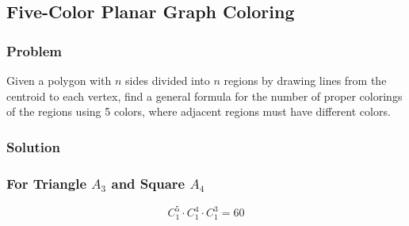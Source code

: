 \documentclass[11pt]{article}
\begin{document}
\subsection{Five-Color Planar Graph Coloring}
\subsubsection{Problem}
Given a polygon with $n$ sides divided into $n$ regions by drawing lines from the centroid to each vertex, find a general formula for the number of proper colorings of the regions using 5 colors, where adjacent regions must have different colors.
\subsubsection*{Solution}
\subsubsection*{For Triangle $A_3$ and Square $A_4$}
\begin{minipage}{.35\textwidth}
    \begin{minipage}{.5\textwidth}
    \end{minipage}
    \begin{minipage}{.4\textwidth}
    \[
        C_1^5\cdot C_1^4 \cdot C_1^3 = 60
    \]
    \end{minipage}
\end{minipage}
\hfill
\end{document}
